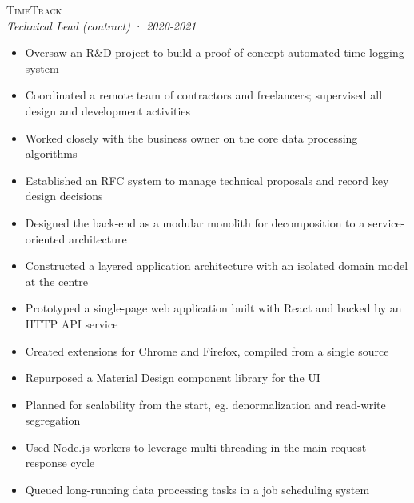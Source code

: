 \documentclass[a4paper,10pt]{article}
\newcommand{\resumeSubheading}[5][12pt]{
  \vspace{#1}
  {\scshape{#2}} \\
  \textit{\small{#3}} \textit{\small{(#4)}} · \textit{\small{#5}}
  \vspace{2pt}
}
\newcommand{\resumeListStart}{\begin{itemize}}
\newcommand{\resumeListEnd}{\end{itemize}}
\newcommand{\resumeItem}[1]{
  \item[\-·]\small{{#1\vspace{1pt}}}
}
\begin{document}
  \begin{minipage}{\textwidth}
    \resumeSubheading
      {TimeTrack}
      {Technical Lead}
      {contract}
      {2020-2021}
    \resumeListStart
      \resumeItem{Oversaw an R\&D project to build a proof-of-concept automated time logging system}
      \resumeItem{Coordinated a remote team of contractors and freelancers; supervised all design and development activities}
      \resumeItem{Worked closely with the business owner on the core data processing algorithms}
      \resumeItem{Established an RFC system to manage technical proposals and record key design decisions}
      \resumeItem{Designed the back-end as a modular monolith for decomposition to a service-oriented architecture}
      \resumeItem{Constructed a layered application architecture with an isolated domain model at the centre}
      \resumeItem{Prototyped a single-page web application built with React and backed by an HTTP API service}
      \resumeItem{Created extensions for Chrome and Firefox, compiled from a single source}
      \resumeItem{Repurposed a Material Design component library for the UI}
      \resumeItem{Planned for scalability from the start, eg. denormalization and read-write segregation}
      \resumeItem{Used Node.js workers to leverage multi-threading in the main request-response cycle}
      \resumeItem{Queued long-running data processing tasks in a job scheduling system}
    \resumeListEnd
  \end{minipage}


\end{document}
